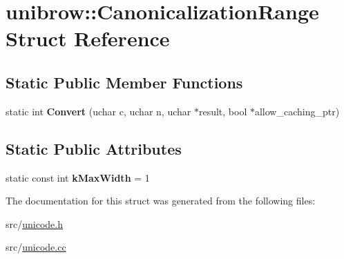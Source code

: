 \hypertarget{structunibrow_1_1_canonicalization_range}{}\section{unibrow\+:\+:Canonicalization\+Range Struct Reference}
\label{structunibrow_1_1_canonicalization_range}
\subsection*{Static Public Member Functions}
\begin{DoxyCompactItemize}
\item 
\hypertarget{structunibrow_1_1_canonicalization_range_a61fdb751fa4e4206a9e649177c219da4}{}static int {\bfseries Convert} (uchar c, uchar n, uchar $\ast$result, bool $\ast$allow\+\_\+caching\+\_\+ptr)\label{structunibrow_1_1_canonicalization_range_a61fdb751fa4e4206a9e649177c219da4}

\end{DoxyCompactItemize}
\subsection*{Static Public Attributes}
\begin{DoxyCompactItemize}
\item 
\hypertarget{structunibrow_1_1_canonicalization_range_a00a80bc3e640dab47c411eb8876bc872}{}static const int {\bfseries k\+Max\+Width} = 1\label{structunibrow_1_1_canonicalization_range_a00a80bc3e640dab47c411eb8876bc872}

\end{DoxyCompactItemize}


The documentation for this struct was generated from the following files\+:\begin{DoxyCompactItemize}
\item 
src/\hyperlink{unicode_8h}{unicode.\+h}\item 
src/\hyperlink{unicode_8cc}{unicode.\+cc}\end{DoxyCompactItemize}
